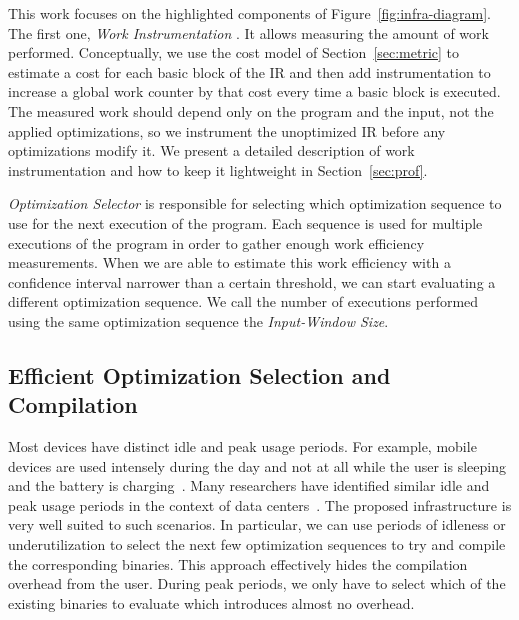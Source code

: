 This work focuses on the highlighted components of Figure~\ref{fig:infra-diagram}. The first one, \textit{Work Instrumentation} . It allows measuring the amount of work performed. Conceptually, we use the cost model of
Section~\ref{sec:metric} to estimate a cost for each basic block of the IR and then add instrumentation to increase a global work counter
by that cost every time a basic block is executed. The measured work should depend only on the program and the input, not the applied
optimizations, so we instrument the unoptimized IR before any optimizations modify it. We present a detailed description of work
instrumentation and how to keep it lightweight in Section~\ref{sec:prof}.

\textit{Optimization Selector} is responsible for selecting which optimization sequence to use for the next execution of the program. Each
sequence is used for multiple executions of the program in order to gather enough work efficiency measurements. When we are able to
estimate this work efficiency with a confidence interval narrower than a certain threshold, we can start evaluating a different
optimization sequence. We call the number of executions performed using the same optimization sequence the \textit{Input-Window Size}.


\subsection{Efficient Optimization Selection and Compilation}

Most devices have distinct idle and peak usage periods. For example, mobile devices are used intensely during the day and not at all while
the user is sleeping and the battery is charging~\citep{mpeis16}. Many researchers have identified similar idle and peak usage periods in
the context of data centers~\citep{armbrust10,chen12b}. The proposed \itercomp infrastructure is very well suited to such scenarios. In
particular, we can use periods of idleness or underutilization to select the next few optimization sequences to try and compile the
corresponding binaries. This approach effectively hides the compilation overhead from the user. During peak periods, we only have to select
which of the existing binaries to evaluate which introduces almost no overhead.
